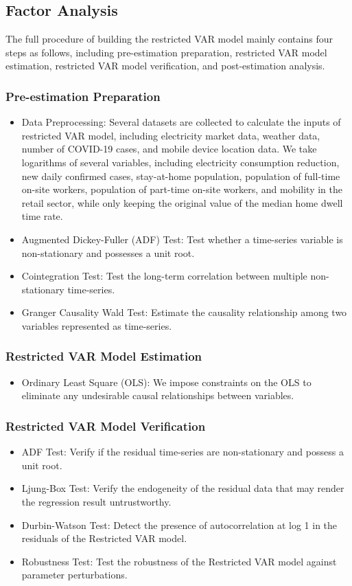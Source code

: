 \documentclass[11pt]{article}
\numberwithin{equation}{section}
\numberwithin{table}{section}
\numberwithin{figure}{section}
\begin{document}
\subsection{Factor Analysis}
The full procedure of building the restricted VAR model mainly contains four steps as follows, including pre-estimation preparation, restricted VAR model estimation, restricted VAR model verification, and post-estimation analysis.
\subsubsection{Pre-estimation Preparation}
\begin{itemize}
  \item Data Preprocessing: Several datasets are collected to calculate the inputs of restricted VAR model, including electricity market data, weather data, number of COVID-19 cases, and mobile device location data. We take logarithms of several variables, including electricity consumption reduction, new daily confirmed cases, stay-at-home population, population of full-time on-site workers, population of part-time on-site workers, and mobility in the retail sector, while only keeping the original value of the median home dwell time rate.
  \item Augmented Dickey-Fuller (ADF) Test: Test whether a time-series variable is non-stationary and possesses a unit root.
  \item Cointegration Test: Test the long-term correlation between multiple non-stationary time-series.
  \item Granger Causality Wald Test: Estimate the causality relationship among two variables represented as time-series.
\end{itemize}
\subsubsection{Restricted VAR Model Estimation}
\begin{itemize}
  \item  Ordinary Least Square (OLS): We impose constraints on the OLS to eliminate any undesirable causal relationships between variables.
\end{itemize}
\subsubsection{Restricted VAR Model Verification}
\begin{itemize}
  \item ADF Test: Verify if the residual time-series are non-stationary and possess a unit root.
  \item Ljung-Box Test: Verify the endogeneity of the residual data that may render the regression result untrustworthy.
  \item Durbin-Watson Test: Detect the presence of autocorrelation at log 1 in the residuals of the Restricted VAR model.
  \item Robustness Test: Test the robustness of the Restricted VAR model against parameter perturbations.
\end{itemize}
\end{document}
